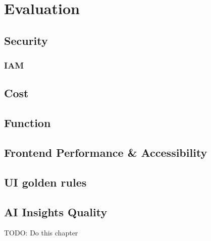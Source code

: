 \chapter{Evaluation}
\label{cha:evaluation}
\section{Security}
\subsection{IAM}
\section{Cost}
\section{Function}
\section{Frontend Performance \& Accessibility}
\section{UI golden rules}
\section{AI Insights Quality}

TODO: Do this chapter
